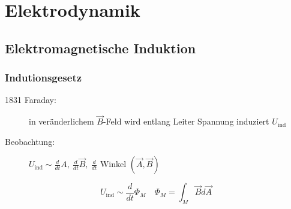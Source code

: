 \documentclass[titlepage,12pt,a4paper,ngerman]{report}
\newcommand{\tx}[1]{\textrm{#1}}
\newcommand{\uind}{U_{\tx{ind}}}
\begin{document}
\chapter{Elektrodynamik}
\setcounter{section}{9}
\section{Elektromagnetische Induktion}
\subsection{Indutionsgesetz}
\begin{description}
	\item [1831 Faraday:] in veränderlichem $\vec{B}$-Feld wird entlang Leiter Spannung induziert $\uind$
	\item [Beobachtung:] $\uind \sim \frac{d}{dt}A,\ \frac{d}{dt} \vec{B},\ \frac{d}{dt}$ Winkel $(\vec{A},\vec{B})$
\end{description}
$$ \uind \sim \frac{d}{dt} \Phi_{M} \quad \Phi_{M} = \int_M \vec{B} d \vec{A} $$
\end{document}
